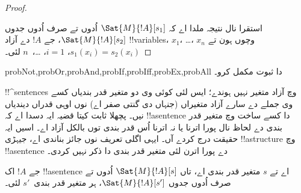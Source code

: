\documentclass[../../../include/open-logic-section]{subfiles}
\begin{document}
\begin{proof}
\begin{enumerate}
\end{enumerate}
استقرا نال نتیجہ ملدا اے کہ $\Sat{M}{!A}[s_1]$ اُدوں تے صرف اُدوں
جدوں $\Sat{M}{!A}[s_2]$، جے $!A$ دے آزاد !!{variable}s، $x_1$،
\dots، $x_n$ وچوں ہون تے $s_1(x_i)=s_2(x_i)$،
$i = 1$، \dots،~$n$ لئی۔
\end{proof}

\begin{probtag}{probNot,probOr,probAnd,probIf,probIff,probEx,probAll}
 دا ثبوت مکمل کرو۔
\end{probtag}

\begin{explain}
!!^{sentence}s وچ آزاد متغیر نہیں ہوندے؛ ایس لئی کوئی وی دو متغیر
قدر بندیاں کسے وی جملے دے سارے آزاد متغیراں (جنہاں دی گنتی صفر
اے) نوں اوہی قدراں دیندیاں نیں۔ پچھلا ثابت کیتا قضیہ ایہ دسدا اے
کہ !!a{sentence} دا کسے ساخت وچ متغیر قدر بندی دے لحاظ نال
پورا اترنا یا نہ اترنا اُس قدر بندی توں بالکل آزاد اے۔ اسیں ایہ
حقیقت درج کردے آں۔ ایہی اگلی تعریف نوں جائز بناندی اے، جیہڑی
!!a{structure} وچ !!a{sentence} دے پورا اترن لئی متغیر قدر
بندی دا ذکر نہیں کردی۔
\end{explain}

\begin{cor}
جے $!A$ اک !!a{sentence} اے تے $s$ متغیر قدر بندی اے، تاں
$\Sat{M}{!A}[s]$ اُدوں تے صرف اُدوں جدوں
$\Sat{M}{!A}[s']$، ہر متغیر قدر بندی~$s'$ لئی۔
\end{cor}
\end{document}
